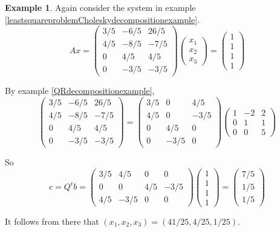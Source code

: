 \documentclass[12pt]{amsart}
\theoremstyle{definition}
\newtheorem{example}[theorem]{Example}
\begin{document}
\begin{example}\label{} Again consider the system in example \ref{leastsquareproblemCholeskydecompositionexample}.
$$Ax = \left(\begin{array}{ccc} 3/5 & -6/5 & 26/5 \\ 4/5 & -8/5 & -7/5 \\ 0 & 4/5 & 4/5 \\ 0 & -3/5 & -3/5 \end{array} \right)\left(\begin{array}{c} x_1 \\ x_2 \\ x_3 \end{array}\right) = \left(\begin{array}{c}1 \\ 1 \\ 1 \\ 1\end{array}\right)$$

By example \ref{QRdecompositionexample},
$$\left(\begin{array}{ccc} 3/5 & -6/5 & 26/5 \\ 4/5 & -8/5 & -7/5 \\ 0 & 4/5 & 4/5 \\ 0 & -3/5 & -3/5 \end{array} \right) = \left(\begin{array}{ccc} 3/5 & 0 & 4/5 \\ 4/5 & 0 & -3/5 \\ 0 & 4/5 & 0 \\ 0 & -3/5 & 0 \end{array} \right) \left(\begin{array}{ccc} 1 & -2 & 2 \\ 0 & 1 & 1 \\ 0 & 0 & 5 \end{array} \right)$$

So
$$c = Q^tb = \left(\begin{array}{cccc} 3/5 & 4/5 & 0 & 0 \\ 0 & 0 & 4/5 & -3/5 \\ 4/5 & -3/5 & 0 & 0 \end{array}\right)\left(\begin{array}{c} 1 \\ 1 \\ 1 \\ 1 \end{array}\right) = \left(\begin{array}{c} 7/5 \\ 1/5 \\ 1/5 \end{array}\right)$$

It follows from there that $(x_1, x_2, x_3) = (41/25, 4/25, 1/25)$.
\end{example}
\end{document}
